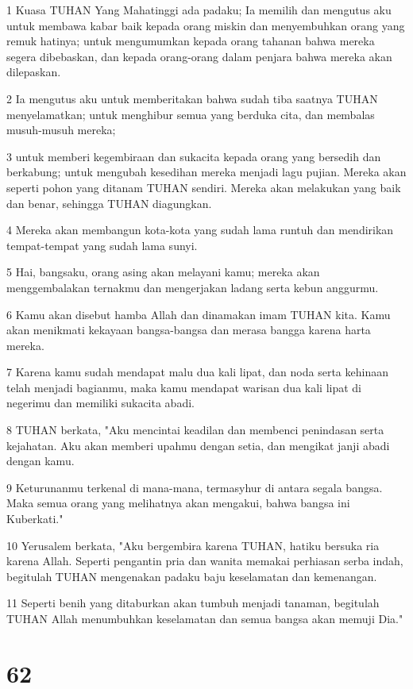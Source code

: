 \par 1 Kuasa TUHAN Yang Mahatinggi ada padaku; Ia memilih dan mengutus aku untuk membawa kabar baik kepada orang miskin dan menyembuhkan orang yang remuk hatinya; untuk mengumumkan kepada orang tahanan bahwa mereka segera dibebaskan, dan kepada orang-orang dalam penjara bahwa mereka akan dilepaskan.
\par 2 Ia mengutus aku untuk memberitakan bahwa sudah tiba saatnya TUHAN menyelamatkan; untuk menghibur semua yang berduka cita, dan membalas musuh-musuh mereka;
\par 3 untuk memberi kegembiraan dan sukacita kepada orang yang bersedih dan berkabung; untuk mengubah kesedihan mereka menjadi lagu pujian. Mereka akan seperti pohon yang ditanam TUHAN sendiri. Mereka akan melakukan yang baik dan benar, sehingga TUHAN diagungkan.
\par 4 Mereka akan membangun kota-kota yang sudah lama runtuh dan mendirikan tempat-tempat yang sudah lama sunyi.
\par 5 Hai, bangsaku, orang asing akan melayani kamu; mereka akan menggembalakan ternakmu dan mengerjakan ladang serta kebun anggurmu.
\par 6 Kamu akan disebut hamba Allah dan dinamakan imam TUHAN kita. Kamu akan menikmati kekayaan bangsa-bangsa dan merasa bangga karena harta mereka.
\par 7 Karena kamu sudah mendapat malu dua kali lipat, dan noda serta kehinaan telah menjadi bagianmu, maka kamu mendapat warisan dua kali lipat di negerimu dan memiliki sukacita abadi.
\par 8 TUHAN berkata, "Aku mencintai keadilan dan membenci penindasan serta kejahatan. Aku akan memberi upahmu dengan setia, dan mengikat janji abadi dengan kamu.
\par 9 Keturunanmu terkenal di mana-mana, termasyhur di antara segala bangsa. Maka semua orang yang melihatnya akan mengakui, bahwa bangsa ini Kuberkati."
\par 10 Yerusalem berkata, "Aku bergembira karena TUHAN, hatiku bersuka ria karena Allah. Seperti pengantin pria dan wanita memakai perhiasan serba indah, begitulah TUHAN mengenakan padaku baju keselamatan dan kemenangan.
\par 11 Seperti benih yang ditaburkan akan tumbuh menjadi tanaman, begitulah TUHAN Allah menumbuhkan keselamatan dan semua bangsa akan memuji Dia."

\chapter{62}

